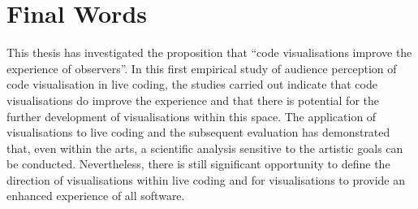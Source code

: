 

\section{Final Words}

This thesis has investigated the proposition that ``code visualisations improve the experience of observers''. In this first empirical study of audience perception of code visualisation in live coding, the studies carried out indicate that code visualisations do improve the experience and that there is potential for the further development of visualisations within this space. The application of visualisations to live coding and the subsequent evaluation has demonstrated that, even within the arts, a scientific analysis sensitive to the artistic goals can be conducted. Nevertheless, there is still significant opportunity to define the direction of visualisations within live coding and for visualisations to provide an enhanced experience of all software.

